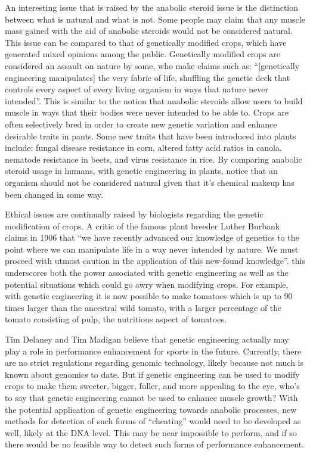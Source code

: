 An interesting issue that is raised by the anabolic steroid issue is the distinction between what is natural and what is not.  Some people may claim that any muscle mass gained with the aid of anabolic steroids would not be considered natural. This issue can be compared to that of genetically modified crops, which have generated mixed opinions among the public.  Genetically modified crops are considered an assault on nature by some, who make claims such as:  “[genetically engineering manipulates] the very fabric of life, shuffling the genetic deck that controls every aspect of every living organism in ways that nature never intended”. \cite{grogan} This is similar to the notion that anabolic steroids allow users to build muscle in ways that their bodies were never intended to be able to. Crops are often selectively bred in order to create new genetic variation and enhance desirable traits in pants. Some new traits that have been introduced into plants include: fungal disease resistance in corn, altered fatty acid ratios in canola, nematode resistance in beets, and virus resistance in rice. \cite{massey} By comparing anabolic steroid usage in humans, with genetic engineering in plants, notice that an organism should not be considered natural given that it's chemical makeup has been changed in some way.

Ethical issues are continually raised by biologists regarding the genetic modification of crops. 
A critic of the famous plant breeder Luther Burbank claims in 1906 that “we have recently advanced our knowledge of genetics to the point where we can manipulate life in a way never intended by nature. We must proceed with utmost caution in the application of this new-found knowledge”. \cite{massey} this underscores both the power associated with genetic engineering as well as the potential situations which could go awry when modifying crops. For example, with genetic engineering it is now possible to make tomatoes which is up to 90 times larger than the ancestral wild tomato, with a larger percentage of the tomato consisting of pulp, the nutritious aspect of tomatoes. \cite{massey}
	
Tim Delaney and Tim Madigan believe that genetic engineering actually may play a role in performance enhancement for sports in the future. Currently, there are no strict regulations regarding genomic technology, likely because not much is known about genomics to date. \cite{delaney}But if genetic engineering can be used to modify crops to make them sweeter, bigger, fuller, and more appealing to the eye, who's to say that genetic engineering cannot be used to enhance muscle growth? With the potential application of genetic engineering towards anabolic processes, new methods for detection of such forms of “cheating” would need to be developed as well, likely at the DNA level.  This may be near impossible to perform, and if so there would be no feasible way to detect such forms of performance enhancement.  
	
